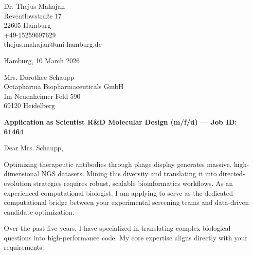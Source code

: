 \documentclass[9pt, a4paper]{extarticle}
\begin{document}
\pagestyle{empty}

\begin{flushleft}
Dr. Thejus Mahajan\\
Reventlowstra{\ss}e 17\\
22605 Hamburg\\
+49-15259697629\\
thejus.mahajan@uni-hamburg.de
\end{flushleft}

\vspace{0.3cm}

\begin{flushright}
Hamburg, 10 March 2026
\end{flushright}

\vspace{0.3cm}

\begin{flushleft}
Mrs. Dorothee Schaupp\\
Octapharma Biopharmaceuticals GmbH\\
Im Neuenheimer Feld 590\\
69120 Heidelberg
\end{flushleft}

\vspace{0.3cm}

\textbf{Application as Scientist R\&D Molecular Design (m/f/d) --- Job ID: 61464}

\vspace{0.2cm}

Dear Mrs. Schaupp,

Optimizing therapeutic antibodies through phage display generates massive, high-dimensional NGS datasets. Mining this diversity and translating it into directed-evolution strategies requires robust, scalable bioinformatics workflows. As an experienced computational biologist, I am applying to serve as the dedicated computational bridge between your experimental screening teams and data-driven candidate optimization.

Over the past five years, I have specialized in translating complex biological questions into high-performance code. My core expertise aligns directly with your requirements:
\end{document}
